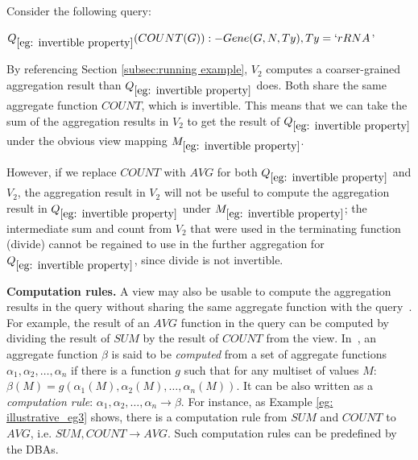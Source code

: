 \begin{example} \label{eg: invertible property}
Consider the following query:
\begin{tabbing}
$Q_{\ref{eg: invertible property}}(COUNT(G)):- Gene(G, N, Ty), Ty = `rRNA$'
\end{tabbing}

By referencing Section \ref{subsec:running example}, $V_2$ computes a coarser-grained aggregation result than $Q_{\ref{eg: invertible property}}$ does. Both %
share the same aggregate function $COUNT$, which is invertible. %
This means that we can take the sum of the aggregation results in $V_2$ to get the result of $Q_{\ref{eg: invertible property}}$ under the obvious view mapping $M_{\ref{eg: invertible property}}$.%

However, if we replace $COUNT$ with $AVG$ for both $Q_{\ref{eg: invertible property}}$ and $V_2$,
the aggregation result in $V_2$ will not be useful to compute the aggregation result in $Q_{\ref{eg: invertible property}}$ under $M_{\ref{eg: invertible property}}$;  the intermediate sum and count from $V_2$ that were used in the terminating function (divide) cannot be regained to use in the further aggregation for $Q_{\ref{eg: invertible property}}$, since divide is not invertible.
\end{example}

\textbf{Computation rules.}  
A view may also be usable to compute the aggregation results in the query without sharing the same aggregate function with the query~\cite{cohen2006user}. For example, the result of an $AVG$ function in the query can be computed by dividing the result of $SUM$ by the result of $COUNT$ from the view. In~\cite{cohen2006rewriting}, an aggregate function $\beta$ is said to be {\em computed} from a set of aggregate functions $\alpha_1, \alpha_2, \dots, \alpha_n$ if there is a function $g$ such that for any multiset of values $M$: $\beta(M) = g(\alpha_1(M), \alpha_2(M), \dots, \alpha_n(M))$. It can be also written as a {\em computation rule}: $\alpha_1, \alpha_2, \dots, \alpha_n \rightarrow \beta$. For instance, as Example \ref{eg: illustrative_eg3} shows, there is a computation rule from $SUM$ and $COUNT$ to $AVG$, i.e. $SUM, COUNT \rightarrow AVG$. Such computation rules can be predefined by the DBAs.

